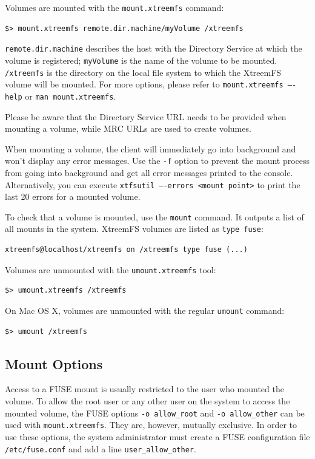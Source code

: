 \documentclass[a4paper,10pt]{book}
\begin{document}
Volumes are mounted with the \texttt{mount.xtreemfs} command:


\begin{verbatim}
$> mount.xtreemfs remote.dir.machine/myVolume /xtreemfs
\end{verbatim}


\texttt{remote.dir.machine} describes the host with the Directory Service at which the volume is registered; \texttt{myVolume} is the name of the volume to be mounted. \texttt{/xtreemfs} is the directory on the local file system to which the XtreemFS volume will be mounted. For more options, please refer to \texttt{mount.xtreemfs ----help} or \texttt{man mount.xtreemfs}.

Please be aware that the Directory Service URL needs to be provided when mounting a volume, while MRC URLs are used to create volumes.

When mounting a volume, the client will immediately go into background and won't display any error messages. Use the \texttt{-f} option to prevent the mount process from going into background and get all error messages printed to the console. Alternatively, you can execute \texttt{xtfsutil ----errors <mount point>} to print the last 20 errors for a mounted volume.

To check that a volume is mounted, use the \texttt{mount} command. It outputs a list of all mounts in the system. XtreemFS volumes are listed as \texttt{type fuse}:

\begin{verbatim}
xtreemfs@localhost/xtreemfs on /xtreemfs type fuse (...)
\end{verbatim}

Volumes are unmounted with the \texttt{umount.xtreemfs} tool:

\begin{verbatim}
$> umount.xtreemfs /xtreemfs
\end{verbatim}

On Mac OS X, volumes are unmounted with the regular \texttt{umount} command:
\begin{verbatim}
$> umount /xtreemfs
\end{verbatim}

\subsection{Mount Options}
\label{sec:mount_opts}

Access to a FUSE mount is usually restricted to the user who mounted the volume. To allow the root user or any other user on the system to access the mounted volume, the FUSE options \texttt{-o allow\_root} and \texttt{-o allow\_other} can be used with \texttt{mount.xtreemfs}. They are, however, mutually exclusive. In order to use these options, the system administrator must create a FUSE configuration file \texttt{/etc/fuse.conf} and add a line \texttt{user\_allow\_other}.
\end{document}
